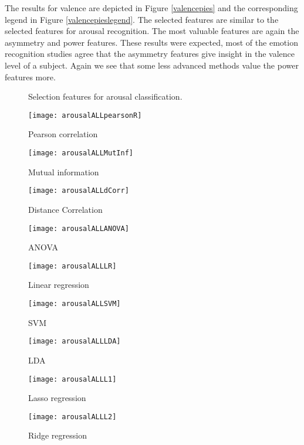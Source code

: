 \npar

The results for valence are depicted in Figure \ref{valencepies} and the corresponding legend in Figure \ref{valencepieslegend}. The selected features are similar to the selected features for arousal recognition. The most valuable features are again the asymmetry and power features. These results were expected, most of the emotion recognition studies agree that the asymmetry features give insight in the valence level of a subject. Again we see that some less advanced methods value the power features more.

\clearpage
\begin{figure}[!tbp]
  \centering
  \caption{Selection features for arousal classification.\label{arousalpies}}
  \begin{minipage}[b]{0.3\textwidth}
    \texttt{[image: arousalALLpearsonR]}
    \caption{Pearson correlation}
  \end{minipage}
  \hfill
  \begin{minipage}[b]{0.3\textwidth}
    \texttt{[image: arousalALLMutInf]}
    \caption{Mutual information}
  \end{minipage}
  \hfill
  \begin{minipage}[b]{0.3\textwidth}
    \texttt{[image: arousalALLdCorr]}
    \caption{Distance Correlation}
  \end{minipage}
  
  \begin{minipage}[b]{0.3\textwidth}
    \texttt{[image: arousalALLANOVA]}
    \caption{ANOVA}
  \end{minipage}
  \hfill
  \begin{minipage}[b]{0.3\textwidth}
    \texttt{[image: arousalALLLR]}
    \caption{Linear regression}
  \end{minipage}
  \hfill
  \begin{minipage}[b]{0.3\textwidth}
    \texttt{[image: arousalALLSVM]}
    \caption{SVM}
  \end{minipage}
  
  \begin{minipage}[b]{0.3\textwidth}
    \texttt{[image: arousalALLLDA]}
    \caption{LDA}
  \end{minipage}
  \hfill
  \begin{minipage}[b]{0.3\textwidth}
    \texttt{[image: arousalALLL1]}
    \caption{Lasso regression}
  \end{minipage}
  \hfill
  \begin{minipage}[b]{0.3\textwidth}
    \texttt{[image: arousalALLL2]}
    \caption{Ridge regression}
  \end{minipage}
  

\end{figure}
